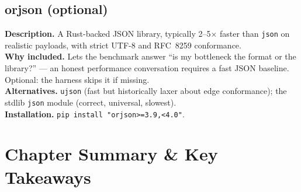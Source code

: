 \subsection{orjson (optional)}
\textbf{Description.} A Rust-backed JSON library, typically 2--5$\times$ faster
than \texttt{json} on realistic payloads, with strict UTF-8 and RFC~8259
conformance.\\
\textbf{Why included.} Lets the benchmark answer ``is my bottleneck the format or
the library?'' --- an honest performance conversation requires a fast JSON
baseline. Optional: the harness skips it if missing.\\
\textbf{Alternatives.} \texttt{ujson} (fast but historically laxer about edge
conformance); the stdlib \texttt{json} module (correct, universal, slowest).\\
\textbf{Installation.} \texttt{pip install "orjson>=3.9,<4.0"}.

\section{Chapter Summary \& Key Takeaways}
\label{sec:ch4-summary}

